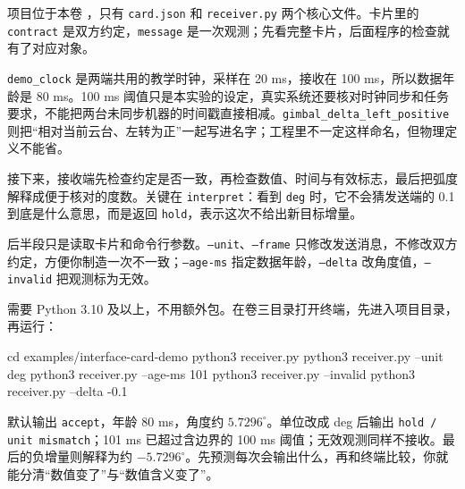 项目位于本卷 ，只有 \texttt{card.json} 和 \texttt{receiver.py} 两个核心文件。卡片里的 \texttt{contract} 是双方约定，\texttt{message} 是一次观测；先看完整卡片，后面程序的检查就有了对应对象。


\texttt{demo\_clock} 是两端共用的教学时钟，采样在 20 ms，接收在 100 ms，所以数据年龄是 80 ms。100 ms 阈值只是本实验的设定，真实系统还要核对时钟同步和任务要求，不能把两台未同步机器的时间戳直接相减。\texttt{gimbal\_delta\_left\_positive} 则把“相对当前云台、左转为正”一起写进名字；工程里不一定这样命名，但物理定义不能省。

接下来，接收端先检查约定是否一致，再检查数值、时间与有效标志，最后把弧度解释成便于核对的度数。关键在 \texttt{interpret}：看到 \texttt{deg} 时，它不会猜发送端的 0.1 到底是什么意思，而是返回 \texttt{hold}，表示这次不给出新目标增量。


后半段只是读取卡片和命令行参数。\texttt{--unit}、\texttt{--frame} 只修改发送消息，不修改双方约定，方便你制造一次不一致；\texttt{--age-ms} 指定数据年龄，\texttt{--delta} 改角度值，\texttt{--invalid} 把观测标为无效。

\noindent\begin{minipage}{\textwidth}

\end{minipage}


\begin{example}[让两端用同一条消息说话]
需要 Python 3.10 及以上，不用额外包。在卷三目录打开终端，先进入项目目录，再运行：
\begin{tbash}
cd examples/interface-card-demo
python3 receiver.py
python3 receiver.py --unit deg
python3 receiver.py --age-ms 101
python3 receiver.py --invalid
python3 receiver.py --delta -0.1
\end{tbash}
默认输出 \texttt{accept}，年龄 80 ms，角度约 $5.7296^\circ$。单位改成 deg 后输出 \texttt{hold / unit mismatch}；101 ms 已超过含边界的 100 ms 阈值；无效观测同样不接收。最后的负增量则解释为约 $-5.7296^\circ$。先预测每次会输出什么，再和终端比较，你就能分清“数值变了”与“数值含义变了”。
\end{example}


